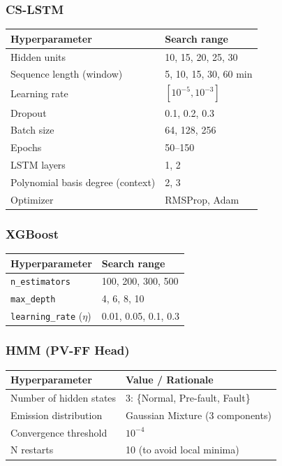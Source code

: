 \documentclass[11pt,a4paper]{article}
\begin{document}
\subsubsection*{CS-LSTM}
\begin{tabularx}{\textwidth}{@{}p{}Y@{}}
\hline
\textbf{Hyperparameter} & \textbf{Search range} \\
\hline
Hidden units & 10, 15, 20, 25, 30 \\
Sequence length (window) & 5, 10, 15, 30, 60 min \\
Learning rate & $[10^{-5}, 10^{-3}]$ \\
Dropout & 0.1, 0.2, 0.3 \\
Batch size & 64, 128, 256 \\
Epochs & 50--150 \\
LSTM layers & 1, 2 \\
Polynomial basis degree (context) & 2, 3 \\
Optimizer & RMSProp, Adam \\
\hline
\end{tabularx}

\subsubsection*{XGBoost}
\begin{tabularx}{\textwidth}{@{}p{}Y@{}}
\hline
\textbf{Hyperparameter} & \textbf{Search range} \\
\hline
\texttt{n\_estimators} & 100, 200, 300, 500 \\
\texttt{max\_depth} & 4, 6, 8, 10 \\
\texttt{learning\_rate} ($\eta$) & 0.01, 0.05, 0.1, 0.3 \\
\hline
\end{tabularx}

\subsubsection*{HMM (PV-FF Head)}
\begin{tabularx}{\textwidth}{@{}p{}Y@{}}
\hline
\textbf{Hyperparameter} & \textbf{Value / Rationale} \\
\hline
Number of hidden states & 3: \{Normal, Pre-fault, Fault\} \\
Emission distribution & Gaussian Mixture (3 components) \\
Convergence threshold & $10^{-4}$ \\
N restarts & 10 (to avoid local minima) \\
\hline
\end{tabularx}
\end{document}
